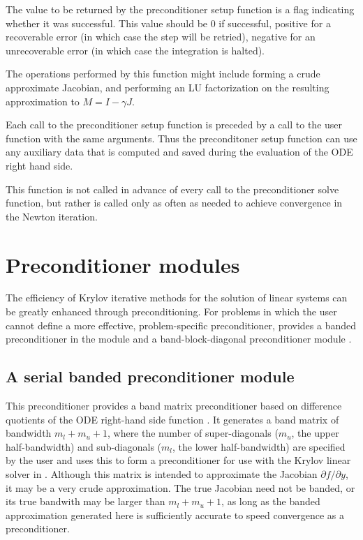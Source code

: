 {
  The value to be returned by the preconditioner setup function is a flag indicating 
  whether it was successful.  This value should be $0$ if successful, 
  positive for a recoverable error (in which case the step will be retried),     
  negative for an unrecoverable error (in which case the integration is halted). 
}
{
  The operations performed by this function might include forming a crude 
  approximate Jacobian, and performing an LU factorization on the resulting            
  approximation to $M=I - \gamma J$.

  Each call to the preconditioner setup function is preceded by a call to     
  the  user function with the same  arguments.  
  Thus the preconditoner setup function can use any auxiliary data that is 
  computed and saved during the evaluation of the ODE right hand side.
  
  This function is not called in advance of every call to the preconditioner solve
  function, but rather is called only as often as needed to achieve convergence in the
  Newton iteration. 
}

\section{Preconditioner modules}\label{ss:preconds}

The efficiency of Krylov iterative methods for the solution of linear systems 
can be greatly enhanced through preconditioning. For problems in which the 
user cannot define a more effective, problem-specific preconditioner,
{\cvode} provides a banded preconditioner in the module {\cvbandpre} and
a band-block-diagonal preconditioner module {\cvbbdpre}.

\subsection{A serial banded preconditioner module}\label{sss:cvbandpre}

This preconditioner provides a band matrix preconditioner based on
difference quotients of the ODE right-hand side function .
It generates a band matrix of bandwidth $m_l + m_u + 1$, where
the number of super-diagonals ($m_u$, the upper half-bandwidth) and
sub-diagonals ($m_l$, the lower half-bandwidth) are specified by
the user and uses this to form a preconditioner for use with the Krylov
linear solver in {\cvspgmr}.  Although this matrix is intended
to approximate the Jacobian $\partial f / \partial y$, 
it may be a very crude approximation.  The true Jacobian need not be banded, or its
true bandwith may be larger than $m_l + m_u + 1$, as long as the
banded approximation generated here is sufficiently accurate
to speed convergence as a preconditioner. 

